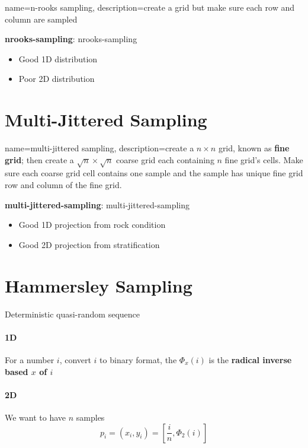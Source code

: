   {
    name=n-rooks sampling,
    description={create a grid but make sure each row and column are sampled}
  }

  \textbf{\Gls{nrooks-sampling}}: \glsdesc{nrooks-sampling}

  \begin{itemize}
    \item Good 1D distribution
    \item Poor 2D distribution
  \end{itemize}

\section{Multi-Jittered Sampling}

  {
    name=multi-jittered sampling,
    description={create a $ n \times n $ grid, known as \textbf{fine grid};
    then create a $ \sqrt{n} \times \sqrt{n} $ coarse grid each
    containing $ n $ fine grid's cells.
    Make sure each coarse grid cell contains one sample
    and the sample has unique fine grid row and column of the fine grid.}
  }

  \textbf{\Gls{multi-jittered-sampling}}: \glsdesc{multi-jittered-sampling}

  \begin{itemize}
    \item Good 1D projection from rock condition
    \item Good 2D projection from stratification
  \end{itemize}

\section{Hammersley Sampling}

  Deterministic quasi-random sequence

  \paragraph{1D} For a number $ i $, convert $ i $ to binary format, the
  $ \Phi_{x} \left( i \right) $ is the \textbf{radical inverse based $ x $ of $ i $}

  \paragraph{2D} We want to have $ n $ samples
  \begin{equation}
    p_{i}
      = \left( x_{i}, y_{i} \right)
      = \left[ \frac{i}{n}, \Phi_{2}\left( i \right) \right]
  \end{equation}

